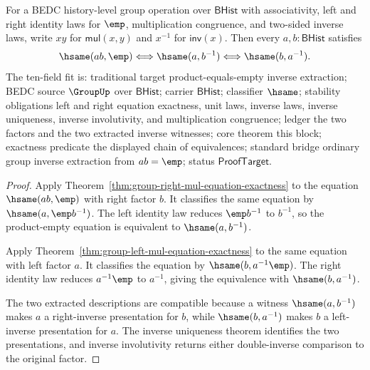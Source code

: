 \begin{theorem}
\label{thm:group-product-unit-inverse-correspondence}
For a BEDC history-level group operation over $\mathsf{BHist}$ with
associativity, left and right identity laws for $\emp$, multiplication
congruence, and two-sided inverse laws, write $xy$ for
$\mathsf{mul}(x,y)$ and $x^{-1}$ for $\mathsf{inv}(x)$. Then every
$a,b:\mathsf{BHist}$ satisfies
$$
\hsame(ab,\emp)
\Longleftrightarrow
\hsame(a,b^{-1})
\Longleftrightarrow
\hsame(b,a^{-1}).
$$
The ten-field fit is: traditional target product-equals-empty inverse
extraction; BEDC source $\GroupUp$ over $\mathsf{BHist}$; carrier
$\mathsf{BHist}$; classifier $\hsame$; stability obligations left and right
equation exactness, unit laws, inverse laws, inverse uniqueness, inverse
involutivity, and multiplication congruence; ledger the two factors and the
two extracted inverse witnesses; core theorem this block; exactness predicate
the displayed chain of equivalences; standard bridge ordinary group inverse
extraction from $ab=\emp$; status $\mathsf{ProofTarget}$.
\end{theorem}
\begin{proof}
Apply Theorem~\ref{thm:group-right-mul-equation-exactness} to the equation
$\hsame(ab,\emp)$ with right factor $b$. It classifies the same equation by
$\hsame(a,\emp b^{-1})$. The left identity law reduces $\emp b^{-1}$ to $b^{-1}$,
so the product-empty equation is equivalent to $\hsame(a,b^{-1})$.

Apply Theorem~\ref{thm:group-left-mul-equation-exactness} to the same equation
with left factor $a$. It classifies the equation by $\hsame(b,a^{-1}\emp)$. The
right identity law reduces $a^{-1}\emp$ to $a^{-1}$, giving the equivalence with
$\hsame(b,a^{-1})$.

The two extracted descriptions are compatible because a witness
$\hsame(a,b^{-1})$ makes $a$ a right-inverse presentation for $b$, while
$\hsame(b,a^{-1})$ makes $b$ a left-inverse presentation for $a$. The inverse
uniqueness theorem identifies the two presentations, and inverse involutivity
returns either double-inverse comparison to the original factor.
\end{proof}

